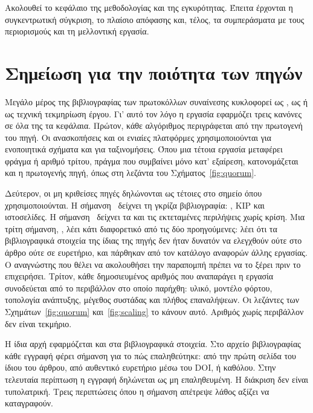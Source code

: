 Ακολουθεί το κεφάλαιο της μεθοδολογίας και της εγκυρότητας. Έπειτα
έρχονται η συγκεντρωτική σύγκριση, το πλαίσιο απόφασης και, τέλος, τα
συμπεράσματα με τους περιορισμούς και τη μελλοντική εργασία.

\section{Σημείωση για την ποιότητα των πηγών}
\label{sec:sources}

Μεγάλο μέρος της βιβλιογραφίας των πρωτοκόλλων συναίνεσης κυκλοφορεί ως
, ως  ή ως τεχνική τεκμηρίωση έργου. Γι' αυτό
τον λόγο η εργασία εφαρμόζει τρεις κανόνες σε όλα της τα κεφάλαια.
Πρώτον, κάθε αλγόριθμος περιγράφεται από την πρωτογενή του πηγή. Οι
ανασκοπήσεις και οι ενιαίες πλατφόρμες χρησιμοποιούνται για ενοποιητικά
σχήματα και για ταξινομήσεις. Όπου μια τέτοια εργασία μεταφέρει φράγμα ή
αριθμό τρίτου, πράγμα που συμβαίνει μόνο κατ' εξαίρεση, κατονομάζεται και
η πρωτογενής πηγή, όπως στη λεζάντα του Σχήματος~\ref{fig:quorum}.

Δεύτερον, οι μη κριθείσες πηγές δηλώνονται ως τέτοιες στο σημείο όπου
χρησιμοποιούνται. Η σήμανση \grey\ δείχνει τη γκρίζα βιβλιογραφία:
, KIP και ιστοσελίδες. Η σήμανση \prep\ δείχνει τα
 και τις εκτεταμένες περιλήψεις χωρίς κρίση. Μια τρίτη
σήμανση, \unver, λέει κάτι διαφορετικό από τις δύο προηγούμενες: λέει ότι
τα βιβλιογραφικά στοιχεία της ίδιας της πηγής δεν ήταν δυνατόν να
ελεγχθούν ούτε στο άρθρο ούτε σε ευρετήριο, και πάρθηκαν από τον κατάλογο
αναφορών άλλης εργασίας. Ο αναγνώστης που θέλει να ακολουθήσει την
παραπομπή πρέπει να το ξέρει πριν το επιχειρήσει. Τρίτον, κάθε
δημοσιευμένος αριθμός που αναπαράγει η εργασία συνοδεύεται από το
περιβάλλον στο οποίο παρήχθη: υλικό, μοντέλο φόρτου, τοπολογία ανάπτυξης,
μέγεθος συστάδας και πλήθος επαναλήψεων. Οι λεζάντες των
Σχημάτων~\ref{fig:quorum} και~\ref{fig:scaling} το κάνουν αυτό. Αριθμός
χωρίς περιβάλλον δεν είναι τεκμήριο.

Η ίδια αρχή εφαρμόζεται και στα βιβλιογραφικά στοιχεία. Στο αρχείο
βιβλιογραφίας κάθε εγγραφή φέρει σήμανση για το πώς επαληθεύτηκε: από την
πρώτη σελίδα του ίδιου του άρθρου, από αυθεντικό ευρετήριο μέσω του DOI,
ή καθόλου. Στην τελευταία περίπτωση η εγγραφή δηλώνεται ως μη
επαληθευμένη. Η διάκριση δεν είναι τυπολατρική. Τρεις περιπτώσεις όπου η
σήμανση απέτρεψε λάθος αξίζει να καταγραφούν.

